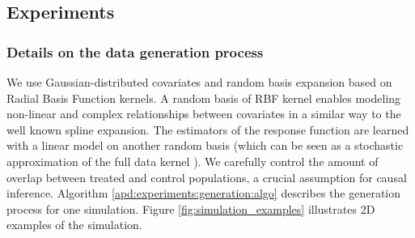 \documentclass[a4paper,num-refs]{oup-contemporary}%
\begin{document}
\subsection{Experiments}

\subsubsection{Details on the data generation process}
\label{apd:experiments:generation}

We use Gaussian-distributed covariates and random basis expansion based on
Radial Basis Function kernels. A random basis of RBF kernel enables modeling
non-linear and complex relationships between covariates in a similar way to the
well known spline expansion. The estimators of the response function are learned
with a linear model on another random basis (which can be seen as a stochastic
approximation of the full data kernel \cite{rahimi_random_2008}). We carefully
control the amount of overlap between treated and control populations, a crucial
assumption for causal inference. Algorithm \ref{apd:experiments:generation:algo} describes the generation process for one simulation. Figure \ref{fig:simulation_examples}
illustrates 2D examples of the simulation.
\end{document}
